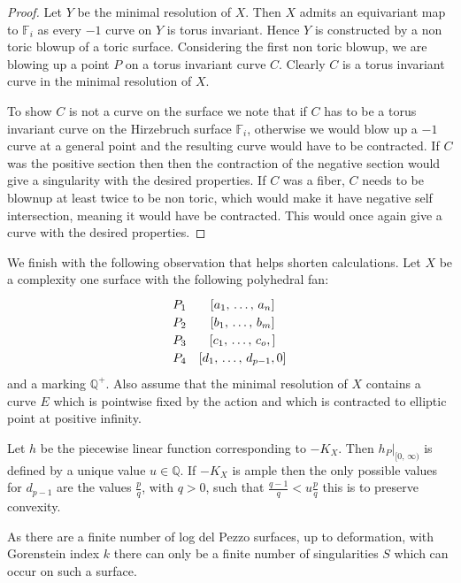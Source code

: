 \documentclass[12pt,a4paper]{book}      %
\newcommand{\mb}[1]{\mathbb{#1}}
\begin{document}
\begin{proof}
Let $Y$ be the minimal resolution of $X$. Then $X$ admits an equivariant map to $\mb{F}_i$ as every $-1$ curve on $Y$ is torus invariant. Hence $Y$ is constructed by a non toric blowup of a toric surface. Considering the first non toric blowup, we are blowing up a point $P$ on a torus invariant curve $C$. Clearly $C$ is a torus invariant curve in the minimal resolution of $X$.

To show $C$ is not a curve on the surface we note that if $C$ has to be a torus invariant curve on the Hirzebruch surface $\mb{F}_i$, otherwise we would blow up a $-1$ curve at a general point and the resulting curve would have to be contracted. If $C$ was the positive section then then the contraction of the negative section would give a singularity with the desired properties. If $C$ was a fiber, $C$ needs to be blownup at least twice to be non toric, which would make it have negative self intersection, meaning it would have be contracted. This would once again give a curve with the desired properties.
\end{proof}



We finish with the following observation that helps shorten calculations.
Let $X$ be a complexity one surface with the following polyhedral fan:
\[\def\arraystretch{1.2}
\begin{array}{cc}
P_1 & \left[ a_1, \, \dots , \, a_n \right] \\ 
P_2 & \left[b_1 , \, \dots, \, b_m \right] \\
P_3 & \left[c_1, \, \dots, \, c_o, \right] \\
P_4 & \left[d_1, \, \dots, \, d_{p-1}, 0\right]  \\
\end{array}
\]
and a marking $\mb{Q}^+$.
Also assume that the minimal resolution of $X$ contains a curve $E$ which is pointwise fixed by the action and which is contracted to elliptic point at positive infinity.

Let $h$ be the piecewise linear function corresponding to $-K_X$. Then $h_P|_{[0, \, \infty)}$ is defined by a unique value $u \in \mb{Q}$. If $-K_X$ is ample then the only possible values for $d_{p-1}$ are the values $\frac{p}{q}$, with $q >0$, such that $\frac{q-1}{q} < u\frac{p}{q}$ this is to preserve convexity. 


As there are a finite number of log del Pezzo surfaces, up to deformation, with Gorenstein index $k$ there can only be a finite number of singularities $S$ which can occur on such a surface. 
\end{document}
